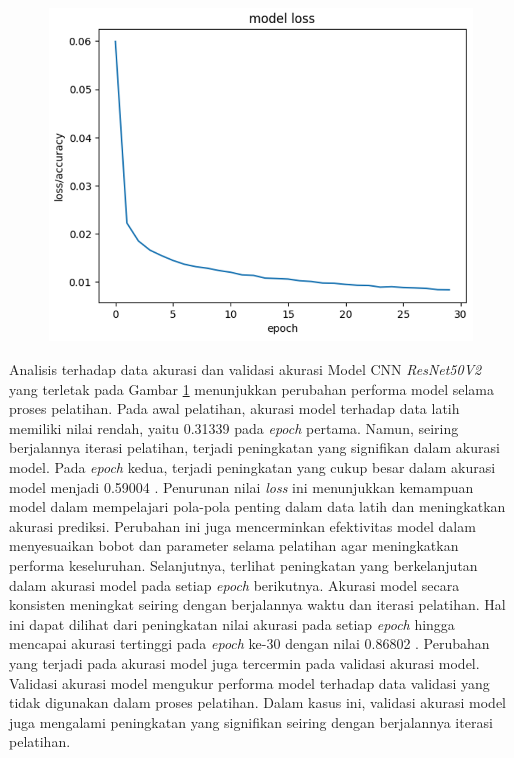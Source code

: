 \begin{figure}[!hbt]
	\centering
	\includegraphics[width=0.7\linewidth]{gambar/bener/Loss_ModelCNNResNet50V2.png}
	\label{fig:lossModelCNNResNet50v2}
\end{figure}

Analisis terhadap data akurasi dan validasi akurasi Model CNN \textit{ResNet50V2} yang terletak pada Gambar \ref{fig:lossModelCNNResNet50v2} menunjukkan perubahan performa model selama proses pelatihan. Pada awal pelatihan, akurasi model terhadap data latih memiliki nilai rendah, yaitu 0.31339 pada \textit{epoch} pertama. Namun, seiring berjalannya iterasi pelatihan, terjadi peningkatan yang signifikan dalam akurasi model. Pada \textit{epoch} kedua, terjadi peningkatan yang cukup besar dalam akurasi model menjadi 0.59004 . Penurunan nilai \textit{loss} ini menunjukkan kemampuan model dalam mempelajari pola-pola penting dalam data latih dan meningkatkan akurasi prediksi. Perubahan ini juga mencerminkan efektivitas model dalam menyesuaikan bobot dan parameter selama pelatihan agar meningkatkan performa keseluruhan. Selanjutnya, terlihat peningkatan yang berkelanjutan dalam akurasi model pada setiap \textit{epoch} berikutnya. Akurasi model secara konsisten meningkat seiring dengan berjalannya waktu dan iterasi pelatihan. Hal ini dapat dilihat dari peningkatan nilai akurasi pada setiap \textit{epoch} hingga mencapai akurasi tertinggi pada \textit{epoch} ke-30 dengan nilai 0.86802 . Perubahan yang terjadi pada akurasi model juga tercermin pada validasi akurasi model. Validasi akurasi model mengukur performa model terhadap data validasi yang tidak digunakan dalam proses pelatihan. Dalam kasus ini, validasi akurasi model juga mengalami peningkatan yang signifikan seiring dengan berjalannya iterasi pelatihan.

